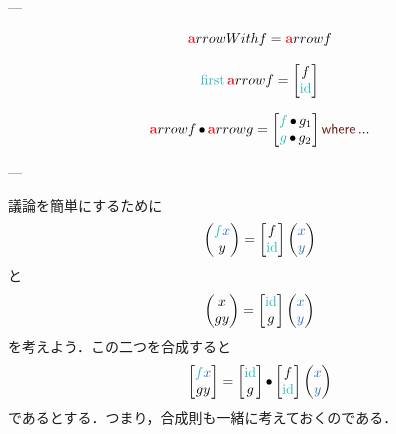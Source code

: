 \documentclass[a5paper,twoside,fleqn,draft]{jsbook}
\begin{document}
---

\begin{equation}
  \hTypeName{a}rrowWith{f}=\hTypeName{a}rrow{f}
\end{equation}

\begin{equation}
  \mFirst\hTypeName{a}rrow{f}=\begin{bmatrix}f\\\mId\end{bmatrix}
\end{equation}

\begin{equation}
  \hTypeName{a}rrow{f}\mCompCat\hTypeName{a}rrow{g}
  =
  \begin{bmatrix}
    \hFunc{f}\hCompose g_1\\
    \hFunc{g}\hCompose g_2
  \end{bmatrix}
  \mWhere...
\end{equation}

---

議論を簡単にするために
\begin{equation}
  \hPairWith{\hFunc{f}\hVar{x}}{y}
  =\begin{bmatrix}
  f\\
  \mId
  \end{bmatrix}
  \hPairWith{\hVar{x}}{\hVar{y}}
\end{equation}
と
\begin{equation}
  \hPairWith{x}{gy}
  =\begin{bmatrix}
  \mId\\
  g
  \end{bmatrix}
  \hPairWith{\hVar{x}}{\hVar{y}}
\end{equation}
を考えよう．この二つを合成すると
\begin{equation}
  \begin{bmatrix}
    \hFunc{f}\hVar{x}\\
    gy
  \end{bmatrix}
  =
  \begin{bmatrix}
    \mId\\
    g
  \end{bmatrix}
  \mCompCat
  \begin{bmatrix}
    f\\
    \mId
  \end{bmatrix}
  \hPairWith{\hVar{x}}{\hVar{y}}
\end{equation}
であるとする．つまり，合成則も一緒に考えておくのである．
\end{document}
